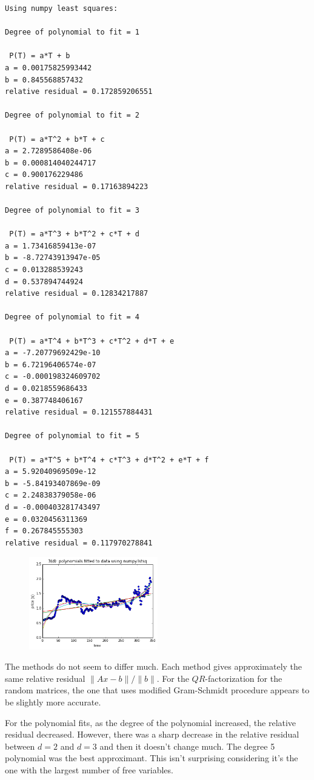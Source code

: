 \documentclass[10pt]{article}
\begin{document}
\begin{enumerate}
\begin{verbatim}
Using numpy least squares:

Degree of polynomial to fit = 1

 P(T) = a*T + b
a = 0.00175825993442
b = 0.845568857432
relative residual = 0.172859206551

Degree of polynomial to fit = 2

 P(T) = a*T^2 + b*T + c
a = 2.7289586408e-06
b = 0.000814040244717
c = 0.900176229486
relative residual = 0.17163894223

Degree of polynomial to fit = 3

 P(T) = a*T^3 + b*T^2 + c*T + d
a = 1.73416859413e-07
b = -8.72743913947e-05
c = 0.013288539243
d = 0.537894744924
relative residual = 0.12834217887

Degree of polynomial to fit = 4

 P(T) = a*T^4 + b*T^3 + c*T^2 + d*T + e
a = -7.20779692429e-10
b = 6.72196406574e-07
c = -0.000198324609702
d = 0.0218559686433
e = 0.387748406167
relative residual = 0.121557884431

Degree of polynomial to fit = 5

 P(T) = a*T^5 + b*T^4 + c*T^3 + d*T^2 + e*T + f
a = 5.92040969509e-12
b = -5.84193407869e-09
c = 2.24838379058e-06
d = -0.000403281743497
e = 0.0320456311369
f = 0.267845555303
relative residual = 0.117970278841
\end{verbatim}

\begin{figure}[H]
  \centering
    \includegraphics[width=0.5\textwidth]{p3fig3}
\end{figure}

The methods do not seem to differ much. Each method gives approximately the same relative residual $ \| Ax - b \|/\|b\| $. For the $QR$-factorization for the random matrices, the one that uses modified Gram-Schmidt procedure appears to be slightly more accurate.

For the polynomial fits, as the degree of the polynomial increased, the relative residual decreased. However, there was a sharp decrease in the relative residual between $d = 2$ and $d = 3$ and then it doesn't change much. The degree 5 polynomial was the best approximant. This isn't surprising considering it's the one with the largest number of free variables.

\end{enumerate}
\end{document}
